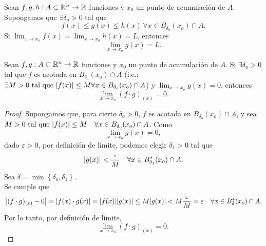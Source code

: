 \begin{propertie} \label{prop:sandwich} %
Sean $f, g, h : A \subset \mathbb{R}^n \to \mathbb{R}$ funciones y $x_0$ un punto de acumulaci\'on de $A$. Supongamos que $\exists \delta_o > 0$ tal que 
\[
 f(x) \le g(x) \le h(x) \, \forall x \in B_{\delta_o}(x_o) \cap A.
\]
Si $\lim_{x \to x_o}f(x) = \lim_{x \to x_o}h(x) = L$, entonces
\[
 \lim_{x \to x_o}g(x) = L.
\]
 
\end{propertie}

\begin{propertie} \label{prop:cero_x_acotada}
 Sean $f, g : A \subset \mathbb{R}^n \to \mathbb{R}$ funciones y $x_0$ un punto de acumulaci\'on de $A$. Si $\exists \delta_o > 0$ tal que $f$ es acotada en $B_{\delta_o}(x_o) \cap A$ (i.e.: $\exists M > 0 \text{ tal que } \abs{f(x)} \le M \forall x \in  B_{\delta_o}(x_o) \cap A$) y $\lim_{x \to x_o}g(x) = 0$, entonces
\[
 \lim_{x \to x_o}(f \cdot g)_{(x)} = 0.
\]
\begin{proof}
\mbox{}

Supongamos que, para cierto $\delta_o > 0$, $f$ es acotada en $B_{\delta_o}(x_o) \cap A$, y sea $M > 0 \text{ tal que } \abs{f(x)} \le M \quad \forall x \in  B_{\delta_o}(x_o) \cap A$.
Como 
\[
\lim_{x \to x_o}g(x) = 0, 
\]
dado $\varepsilon > 0 $, por definici\'on de l\'imite, podemos elegir $\delta_1 > 0$ tal que 
\[
 \abs{g(x)} < \frac{\varepsilon}{M} \quad \forall x \in  B^*_{\delta_1}(x_o) \cap A.                                                                                               
\]
Sea $\delta = \min{ \left\{ \delta_o, \delta_1 \right\} }$. \\
Se cumple que
\[
 \abs{ (f \cdot g)_{(x)} - 0 } = \abs{ f(x) \cdot g(x) } = \abs{f(x)}\abs{g(x)} \le 
 M \abs{g(x)} < M \frac{\varepsilon}{M} = \varepsilon \quad \forall x \in  B^*_{\delta}(x_o) \cap A,
\]
Por lo tanto, por definici\'on de l\'imite,
\[
 \lim_{x \to x_o}(f \cdot g)_{(x)} = 0.
\]

\end{proof}
\end{propertie}


